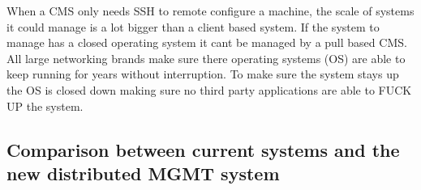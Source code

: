 When a CMS only needs SSH to remote configure a machine, the scale of systems it could manage is a lot bigger than a client based system. If the system to manage has a closed operating system it cant be managed by a pull based CMS. All large networking brands make sure there operating systems (OS) are able to keep running for years without interruption. To make sure the system stays up the OS is closed down making sure no third party applications are able to FUCK UP the system. 

\subsection{Comparison between current systems and the new distributed MGMT system}\label{subsec:distributedmgmt}

